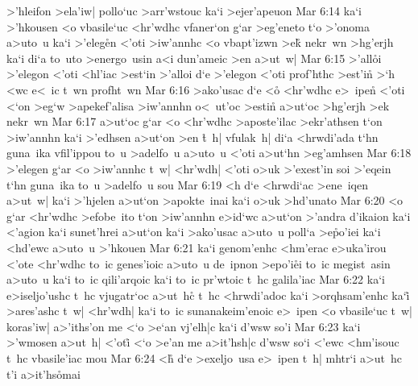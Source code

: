 >'hleifon
>ela'iw|
pollo`uc
>arr'wstouc
ka`i
>ejer'apeuon\bibvsend
\vs Mar 6:14
ka`i
>'hkousen
<o
vbasile`uc
<hr'wdhc
vfaner`on
g`ar
>eg'eneto
t`o
>'onoma
a>uto~u
ka`i
>'eleg\r{e}n
<'oti
>iw'annhc
<o
vbapt'izwn
>ek\r{}
nekr~wn
>hg'erjh
ka`i
di`a
to~uto
>energo~usin
a<i
dun'ameic
>en
a>ut~w|\bibvsend
\vs Mar 6:15
>'all\r{o}i
>'elegon
<'oti
<hl'iac
>est`in
>'alloi
d`e
>'elegon
<'oti
prof'hthc
>est'in\r{}
>`h
<wc
e<~ic
t~wn
profht~wn\bibvsend
\vs Mar 6:16
>ako'usac
d`e
<o\r{}
<hr'wdhc
e>~ipen\r{}
<'oti
<`on
>eg`w
>apekef'alisa
>iw'annhn
o<~ut'oc
>estin\r{}
a>ut`oc
>hg'erjh
>ek
nekr~wn\bibvsend
\vs Mar 6:17
a>ut`oc
g`ar
<o
<hr'wdhc
>aposte'ilac
>ekr'athsen
t`on
>iw'annhn
ka`i
>'edhsen
a>ut`on
>en
\r{t}~h|
vfulak~h|
di`a
<hrwdi'ada
t`hn
guna~ika
vfil'ippou
to~u
>adelfo~u
a>uto~u
<'oti
a>ut`hn
>eg'amhsen\bibvsend
\vs Mar 6:18
>'elegen
g`ar
<o
>iw'annhc
t~w|
<hr'wdh|
<'oti
o>uk
>'exest'in
soi
>'eqein
t`hn
guna~ika
to~u
>adelfo~u
sou\bibvsend
\vs Mar 6:19
<h
d`e
<hrwdi`ac
>ene~iqen
a>ut~w|
ka`i
>'hjelen
a>ut`on
>apokte~inai
ka`i
o>uk
>hd'unato\bibvsend
\vs Mar 6:20
<o
g`ar
<hr'wdhc
>efobe~ito
t`on
>iw'annhn
e>id`wc
a>ut`on
>'andra
d'ikaion
ka`i
<'agion
ka`i
sunet'hrei
a>ut`on
ka`i
>ako'usac
a>uto~u
poll`a
>e\r{p}o'iei
ka`i
<hd'ewc
a>uto~u
>'hkouen\bibvsend
\vs Mar 6:21
ka`i
genom'enhc
<hm'erac
e>uka'irou
<'ote
<hr'wdhc
to~ic
genes'ioic
a>uto~u
de~ipnon
>epo'i\r{e}i
to~ic
megist~asin
a>uto~u
ka`i
to~ic
qili'arqoic
ka`i
to~ic
pr'wtoic
t~hc
galila'iac\bibvsend
\vs Mar 6:22
ka`i
e>iseljo'ushc
t~hc
vjugatr`oc
a>ut~hc\r{}
t~hc
<hrwdi'adoc
ka`i
>orqhsam'enhc
ka`i\r{}
>ares'ashc
t~w|
<hr'wdh|
ka`i
to~ic
sunanakeim'enoic
e>~ipen
<o
vbasile`uc
t~w|
koras'iw|
a>'iths'on
me
<`o
>e`an
vj'elh|c
ka`i
d'wsw
so'i\bibvsend
\vs Mar 6:23
ka`i
>'wmosen
a>ut~h|
<'oti\r{}
<`o
>e'an
me
a>it'hsh|c
d'wsw
so`i
<'ewc
<hm'isouc
t~hc
vbasile'iac
mou\bibvsend
\vs Mar 6:24
<h\r{}
d`e
>exeljo~usa
e>~ipen
t~h|
mhtr`i
a>ut~hc
t'i
a>it'hs\r{o}mai
